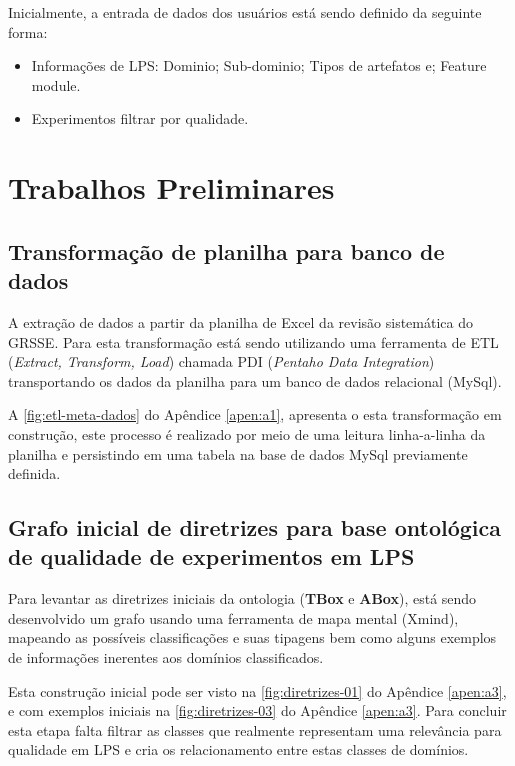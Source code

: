 Inicialmente, a entrada de dados dos usuários está sendo definido da seguinte forma:

\begin{itemize}
	\item Informações de LPS:
		\subitem Dominio;
		\subitem Sub-dominio;
		\subitem Tipos de artefatos e;
		\subitem Feature module.
	\item Experimentos
		\subitem filtrar por qualidade.
\end{itemize}


\section{Trabalhos Preliminares}

\subsection{Transformação de planilha para banco de dados}

A extração de dados a partir da planilha de Excel da revisão sistemática do GRSSE. Para esta transformação está sendo utilizando uma ferramenta de ETL (\textit{Extract, Transform, Load}) chamada PDI (\textit{Pentaho Data Integration}) transportando os dados da planilha para um banco de dados relacional (MySql).

A \ref{fig:etl-meta-dados} do Apêndice \ref{apen:a1}, apresenta o esta transformação em construção, este processo é realizado por meio de uma leitura linha-a-linha da planilha e persistindo em uma tabela na base de dados MySql previamente definida.

\subsection{Grafo inicial de diretrizes para base ontológica de qualidade de experimentos em LPS}

Para levantar as diretrizes iniciais da ontologia (\textbf{TBox} e \textbf{ABox}), está sendo desenvolvido um grafo usando uma ferramenta de mapa mental (Xmind), mapeando as possíveis classificações e suas tipagens bem como alguns exemplos de informações inerentes aos domínios classificados.

Esta construção inicial pode ser visto na \ref{fig:diretrizes-01} do Apêndice \ref{apen:a3}, e com exemplos iniciais na \ref{fig:diretrizes-03} do Apêndice \ref{apen:a3}. Para concluir esta etapa falta filtrar as classes que realmente representam uma relevância para qualidade em LPS e cria os relacionamento entre estas classes de domínios.

